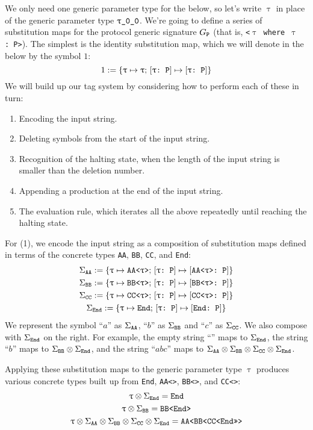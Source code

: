 \documentclass[../generics]{subfiles}
\begin{document}
We only need one generic parameter type for the below, so let's write $\uptau$ in place of the generic parameter type $\rT$. We're going to define a series of substitution maps for the protocol generic signature $G_{\texttt{P}}$ (that is, \texttt{<$\uptau$ where $\uptau$:~P>}). The simplest is the identity substitution map, which we will denote in the below by the symbol $1$:
\[1 := \{\texttt{$\uptau$} \mapsto \texttt{$\uptau$};\,[\texttt{$\uptau$:~P}] \mapsto [\texttt{$\uptau$:~P}]\}\]
We will build up our tag system by considering how to perform each of these in turn:
\begin{enumerate}
\item Encoding the input string.
\item Deleting symbols from the start of the input string.
\item Recognition of the halting state, when the length of the input string is smaller than the deletion number.
\item Appending a production at the end of the input string.
\item The evaluation rule, which iterates all the above repeatedly until reaching the halting state.
\end{enumerate}

For (1), we encode the input string as a composition of substitution maps defined in terms of the concrete types \texttt{AA}, \texttt{BB}, \texttt{CC}, and \texttt{End}:
\begin{gather*}
\Sigma_{\texttt{AA}} := \{\texttt{$\uptau$} \mapsto \texttt{AA<$\uptau$>};\,[\texttt{$\uptau$:~P}] \mapsto [\texttt{AA<$\uptau$>:~P}]\}\\
\Sigma_{\texttt{BB}} := \{\texttt{$\uptau$} \mapsto \texttt{BB<$\uptau$>};\,[\texttt{$\uptau$:~P}] \mapsto [\texttt{BB<$\uptau$>:~P}]\}\\
\Sigma_{\texttt{CC}} := \{\texttt{$\uptau$} \mapsto \texttt{CC<$\uptau$>};\,[\texttt{$\uptau$:~P}] \mapsto [\texttt{CC<$\uptau$>:~P}]\}\\
\Sigma_{\texttt{End}} := \{\texttt{$\uptau$} \mapsto \texttt{End};\,[\texttt{$\uptau$:~P}] \mapsto [\texttt{End:~P}]\}
\end{gather*}
We represent the symbol ``$a$'' as $\Sigma_{\texttt{AA}}$, ``$b$'' as $\Sigma_{\texttt{BB}}$ and ``$c$'' as $\Sigma_{\texttt{CC}}$. We also compose with $\Sigma_{\texttt{End}}$ on the right. For example, the empty string ``'' maps to $\Sigma_{\texttt{End}}$, the string ``$b$'' maps to $\Sigma_{\texttt{BB}}\otimes\Sigma_{\texttt{End}}$, and the string ``$abc$'' maps to $\Sigma_{\texttt{AA}}\otimes\Sigma_{\texttt{BB}}\otimes\Sigma_{\texttt{CC}}\otimes\Sigma_{\texttt{End}}$.

Applying these substitution maps to the generic parameter type $\uptau$ produces various concrete types built up from \texttt{End}, \texttt{AA<>}, \texttt{BB<>}, and \texttt{CC<>}:
\begin{gather*}
\uptau\otimes\Sigma_{\texttt{End}} = \texttt{End}\\
\uptau\otimes\Sigma_{\texttt{BB}} = \texttt{BB<End>}\\
\uptau\otimes\Sigma_{\texttt{AA}}\otimes\Sigma_{\texttt{BB}}\otimes\Sigma_{\texttt{CC}}\otimes\Sigma_{\texttt{End}} = \texttt{AA<BB<CC<End>>>}
\end{gather*}
\end{document}
